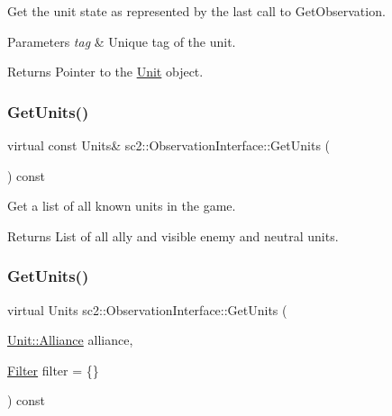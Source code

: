 Get the unit state as represented by the last call to Get\+Observation. 
\begin{DoxyParams}{Parameters}
{\em tag} & Unique tag of the unit. \\
\hline
\end{DoxyParams}
\begin{DoxyReturn}{Returns}
Pointer to the \hyperlink{classsc2_1_1_unit}{Unit} object. 
\end{DoxyReturn}
\mbox{\label{classsc2_1_1_observation_interface_ab08e71ba04b19d3b4048ce9da6838e00}} 
\subsubsection{\texorpdfstring{Get\+Units()}{GetUnits()}\hspace{0.1cm}{\footnotesize\ttfamily [1/3]}}
{\footnotesize\ttfamily virtual const Units\& sc2\+::\+Observation\+Interface\+::\+Get\+Units (\begin{DoxyParamCaption}{ }\end{DoxyParamCaption}) const\hspace{0.3cm}{\ttfamily [pure virtual]}}

Get a list of all known units in the game. \begin{DoxyReturn}{Returns}
List of all ally and visible enemy and neutral units. 
\end{DoxyReturn}
\mbox{\label{classsc2_1_1_observation_interface_aa43cfa17a9ac893500bce33eb41e6171}} 
\subsubsection{\texorpdfstring{Get\+Units()}{GetUnits()}\hspace{0.1cm}{\footnotesize\ttfamily [2/3]}}
{\footnotesize\ttfamily virtual Units sc2\+::\+Observation\+Interface\+::\+Get\+Units (\begin{DoxyParamCaption}\item[{\hyperlink{classsc2_1_1_unit_a5a40e672e7599d73ef8ef5758bbd7461}{Unit\+::\+Alliance}}]{alliance,  }\item[{\hyperlink{sc2__interfaces_8h_a5cc3d9751182ccd2b085f3e272bcc88b}{Filter}}]{filter = {\ttfamily \{\}} }\end{DoxyParamCaption}) const\hspace{0.3cm}{\ttfamily [pure virtual]}}


